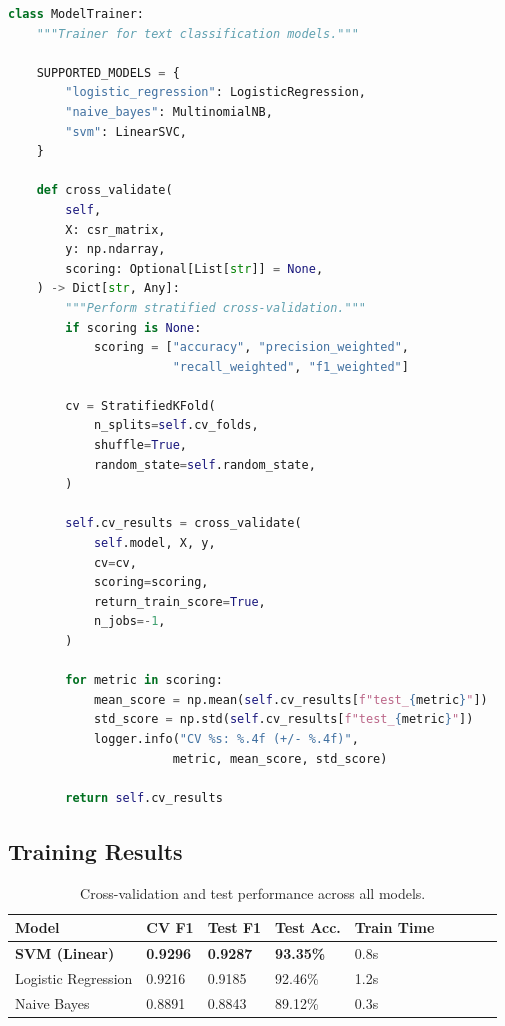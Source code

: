 \documentclass[12pt,a4paper]{article}
\renewcommand{\arraystretch}{1.5}
\newcommand{\goldrowcolors}{%
    \rowcolors{2}{bgCard}{bgDark}%
}
\newcommand{\tableheader}[1]{\textcolor{accentGold}{\textbf{#1}}}
\newcommand{\tablehdrrow}{\rowcolor{accentCard}}
\begin{document}
\begin{lstlisting}[language=Python, caption={Stratified cross-validation implementation (\texttt{src/models/train\_model.py})}]
class ModelTrainer:
    """Trainer for text classification models."""

    SUPPORTED_MODELS = {
        "logistic_regression": LogisticRegression,
        "naive_bayes": MultinomialNB,
        "svm": LinearSVC,
    }

    def cross_validate(
        self,
        X: csr_matrix,
        y: np.ndarray,
        scoring: Optional[List[str]] = None,
    ) -> Dict[str, Any]:
        """Perform stratified cross-validation."""
        if scoring is None:
            scoring = ["accuracy", "precision_weighted",
                       "recall_weighted", "f1_weighted"]

        cv = StratifiedKFold(
            n_splits=self.cv_folds,
            shuffle=True,
            random_state=self.random_state,
        )

        self.cv_results = cross_validate(
            self.model, X, y,
            cv=cv,
            scoring=scoring,
            return_train_score=True,
            n_jobs=-1,
        )

        for metric in scoring:
            mean_score = np.mean(self.cv_results[f"test_{metric}"])
            std_score = np.std(self.cv_results[f"test_{metric}"])
            logger.info("CV %s: %.4f (+/- %.4f)",
                       metric, mean_score, std_score)

        return self.cv_results
\end{lstlisting}

\subsection{Training Results}
\label{subsec:training-results}

\begin{table}[H]
\centering
\goldrowcolors
\renewcommand{\arraystretch}{1.6}
\begin{tabular}{@{}L{4cm} V C{2.5cm} V C{2.5cm} V C{2.5cm} V C{2.5cm}@{}}
\toprule
\tablehdrrow
\tableheader{Model} & \tableheader{CV F1} & \tableheader{Test F1} & \tableheader{Test Acc.} & \tableheader{Train Time} \\
\midrule
\textbf{SVM (Linear)} & \textbf{0.9296} & \textbf{0.9287} & \textbf{93.35\%} & 0.8s \\
Logistic Regression & 0.9216 & 0.9185 & 92.46\% & 1.2s \\
Naive Bayes & 0.8891 & 0.8843 & 89.12\% & 0.3s \\
\bottomrule
\end{tabular}
\caption{Cross-validation and test performance across all models.}
\label{tab:training-results}
\end{table}
\end{document}
